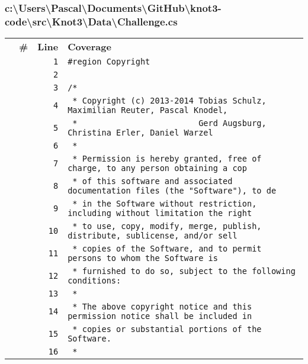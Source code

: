 \documentclass[a4paper,10pt]{article}
\begin{document}
\subsubsection{c:\textbackslash Users\textbackslash Pascal\textbackslash Documents\textbackslash GitHub\textbackslash knot3-code\textbackslash src\textbackslash Knot3\textbackslash Data\textbackslash Challenge.cs}
\begin{longtable}[l]{lrrl}
\textbf{} & \textbf{\#} & \textbf{Line} & \textbf{Coverage}\\
\cellcolor{gray} &  & \verb~1~ & \verb~#region Copyright~\\
\cellcolor{gray} &  & \verb~2~ & \verb~~\\
\cellcolor{gray} &  & \verb~3~ & \verb~/*~\\
\cellcolor{gray} &  & \verb~4~ & \verb~ * Copyright (c) 2013-2014 Tobias Schulz, Maximilian Reuter, Pascal Knodel,~\\
\cellcolor{gray} &  & \verb~5~ & \verb~ *                         Gerd Augsburg, Christina Erler, Daniel Warzel~\\
\cellcolor{gray} &  & \verb~6~ & \verb~ *~\\
\cellcolor{gray} &  & \verb~7~ & \verb~ * Permission is hereby granted, free of charge, to any person obtaining a cop~\\
\cellcolor{gray} &  & \verb~8~ & \verb~ * of this software and associated documentation files (the "Software"), to de~\\
\cellcolor{gray} &  & \verb~9~ & \verb~ * in the Software without restriction, including without limitation the right~\\
\cellcolor{gray} &  & \verb~10~ & \verb~ * to use, copy, modify, merge, publish, distribute, sublicense, and/or sell~\\
\cellcolor{gray} &  & \verb~11~ & \verb~ * copies of the Software, and to permit persons to whom the Software is~\\
\cellcolor{gray} &  & \verb~12~ & \verb~ * furnished to do so, subject to the following conditions:~\\
\cellcolor{gray} &  & \verb~13~ & \verb~ *~\\
\cellcolor{gray} &  & \verb~14~ & \verb~ * The above copyright notice and this permission notice shall be included in ~\\
\cellcolor{gray} &  & \verb~15~ & \verb~ * copies or substantial portions of the Software.~\\
\cellcolor{gray} &  & \verb~16~ & \verb~ *~\\

\end{longtable}
\end{document}
